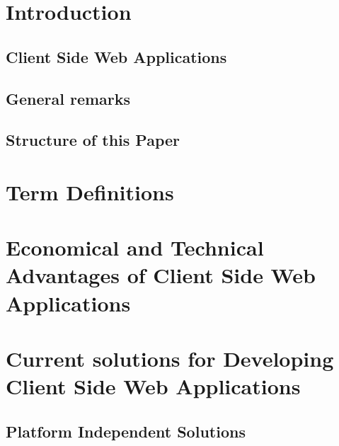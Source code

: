 

\tableofcontents
\newpage

\listoffigures
\newpage

\newpage

\chapter{Introduction}
 
  
 
 \section{Client Side Web Applications}

  

 \section{General remarks}
 
  
  
 \section{Structure of this Paper}
 
  
  
\chapter{Term Definitions}

\chapter{Economical and Technical Advantages of Client Side Web Applications}
 \label{sec:advantages}
 
 
\chapter{Current solutions for Developing Client Side Web Applications}
 \label{sec:currentSolutionsCSWA}
 

 \section{Platform Independent Solutions}
  
  
   
